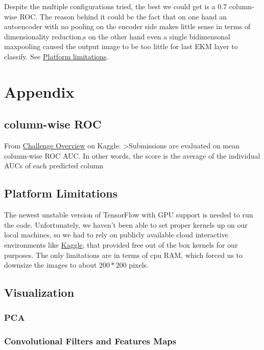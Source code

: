 \documentclass[12pt,halfline,a4paper,]{ouparticle}
\begin{document}
Despite the multiple configurations tried, the best we could get is a
\(0.7\) column-wise ROC. The reason behind it could be the fact that on
one hand an autoencoder with no pooling on the encoder side makes little
sense in terms of dimensionality reduction,s on the other hand even a
single bidimensonal maxpooling caused the output image to be too little
for last EKM layer to classify. See
\protect\hyperlink{limitations}{Platform limitations}.

\hypertarget{appendix}{%
\section{Appendix}\label{appendix}}

\hypertarget{roc}{%
\subsection{column-wise ROC}\label{roc}}

From
\href{https://www.kaggle.com/c/plant-pathology-2020-fgvc7/overview/evaluation}{Challenge
Overview} on Kaggle: \textgreater{}Submissions are evaluated on mean
column-wise ROC AUC. In other words, the score is the average of the
individual AUCs of each predicted column

\hypertarget{limitations}{%
\subsection{Platform Limitations}\label{limitations}}

The newest unstable version of TensorFlow with GPU support is needed to
run the code. Unfortunately, we haven't been able to set proper kernels
up on our local machines, so we had to rely on publicly available cloud
interactive environments like \href{https://www.kaggle.com/}{Kaggle},
that provided free out of the box kernels for our purposes. The only
limitations are in terms of cpu RAM, which forced us to downsize the
images to about \(200*200\) pixels.

\hypertarget{visualization}{%
\subsection{Visualization}\label{visualization}}

\hypertarget{pca}{%
\subsubsection{PCA}\label{pca}}

\hypertarget{convolutional-filters-and-features-maps}{%
\subsubsection{Convolutional Filters and Features
Maps}\label{convolutional-filters-and-features-maps}}




\renewcommand\refname{References}


\end{document}
